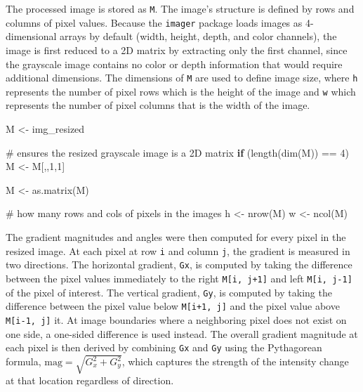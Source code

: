 \documentclass[
]{article}
\newenvironment{Shaded}{\begin{snugshade}}{\end{snugshade}}
\newcommand{\CommentTok}[1]{\textcolor[rgb]{0.37,0.37,0.37}{#1}}
\newcommand{\ControlFlowTok}[1]{\textcolor[rgb]{0.00,0.23,0.31}{\textbf{#1}}}
\newcommand{\DecValTok}[1]{\textcolor[rgb]{0.68,0.00,0.00}{#1}}
\newcommand{\FunctionTok}[1]{\textcolor[rgb]{0.28,0.35,0.67}{#1}}
\newcommand{\NormalTok}[1]{\textcolor[rgb]{0.00,0.23,0.31}{#1}}
\newcommand{\OtherTok}[1]{\textcolor[rgb]{0.00,0.23,0.31}{#1}}
\newcommand{\SpecialCharTok}[1]{\textcolor[rgb]{0.37,0.37,0.37}{#1}}
\begin{document}
The processed image is stored as \texttt{M}. The image's structure is
defined by rows and columns of pixel values. Because the \texttt{imager}
package loads images as 4-dimensional arrays by default (width, height,
depth, and color channels), the image is first reduced to a 2D matrix by
extracting only the first channel, since the grayscale image contains no
color or depth information that would require additional dimensions. The
dimensions of \texttt{M} are used to define image size, where \texttt{h}
represents the number of pixel rows which is the height of the image and
\texttt{w} which represents the number of pixel columns that is the
width of the image.

\begin{Shaded}
\begin{Highlighting}[]
\NormalTok{  M }\OtherTok{\textless{}{-}}\NormalTok{ img\_resized}
  
  \CommentTok{\# ensures the resized grayscale image is a 2D matrix}
  \ControlFlowTok{if}\NormalTok{ (}\FunctionTok{length}\NormalTok{(}\FunctionTok{dim}\NormalTok{(M)) }\SpecialCharTok{==} \DecValTok{4}\NormalTok{) }
\NormalTok{    M }\OtherTok{\textless{}{-}}\NormalTok{ M[,,}\DecValTok{1}\NormalTok{,}\DecValTok{1}\NormalTok{]}
  
\NormalTok{  M }\OtherTok{\textless{}{-}} \FunctionTok{as.matrix}\NormalTok{(M)}
  
  \CommentTok{\# how many rows and cols of pixels in the images}
\NormalTok{  h }\OtherTok{\textless{}{-}} \FunctionTok{nrow}\NormalTok{(M) }
\NormalTok{  w }\OtherTok{\textless{}{-}} \FunctionTok{ncol}\NormalTok{(M)}
\end{Highlighting}
\end{Shaded}

The gradient magnitudes and angles were then computed for every pixel in
the resized image. At each pixel at row \texttt{i} and column
\texttt{j}, the gradient is measured in two directions. The horizontal
gradient, \texttt{Gx}, is computed by taking the difference between the
pixel values immediately to the right \texttt{M{[}i,\ j+1{]}} and left
\texttt{M{[}i,\ j-1{]}} of the pixel of interest. The vertical gradient,
\texttt{Gy}, is computed by taking the difference between the pixel
value below \texttt{M{[}i+1,\ j{]}} and the pixel value above
\texttt{M{[}i-1,\ j{]}} it. At image boundaries where a neighboring
pixel does not exist on one side, a one-sided difference is used
instead. The overall gradient magnitude at each pixel is then derived by
combining \texttt{Gx} and \texttt{Gy} using the Pythagorean formula,
\(\text{mag} = \sqrt{G_x^2 + G_y^2}\), which captures the strength of
the intensity change at that location regardless of direction.
\end{document}
